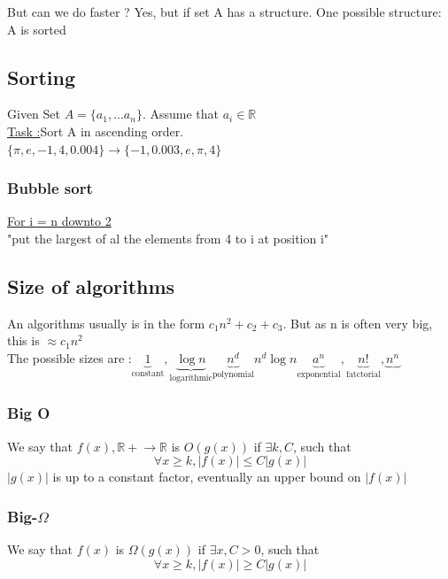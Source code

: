 \documentclass[12pt,a4paper]{article}
\begin{document}
But can we do faster ? Yes, but if set A has a structure. One possible structure: A is sorted

\subsection{Sorting}
Given Set $A = \{a_1,...a_n\}$. Assume that $a_i \in \mathbb{R}$\\
\underline{Task :}Sort A in ascending order.\\
$\{\pi, e, -1, 4, 0.004\} \rightarrow \{-1, 0.003, e, \pi, 4\}$

\subsubsection{Bubble sort}
\underline{For i = n downto 2}\\
"put the largest of al the elements from 4 to i at position i"

\subsection{Size of algorithms}
An algorithms usually is in the form $c_1n^2+c_2+c_3$. But as n is often very big, this is $\approx c_1n^2$\\
The possible sizes are :$\underbrace{1}_{\text{constant}}, \underbrace{\log n}_{\text{logarithmic}} \underbrace{n^d}_{\text{polynomial}} n^d \log n \underbrace{a^n}_{\text{exponential}}, \underbrace{n!}_{\text{fatctorial}}, \underbrace{n^n}$

\subsubsection{Big O}
We say that $f(x), \mathbb{R+} \to \mathbb{R}$ is $O(g(x))$ if $\exists k, C$, such that 
\begin{equation*}
\forall x \geq k  , |f(x)| \leq C|g(x)|
\end{equation*}
$|g(x)|$ is up to a constant factor, eventually an upper bound on $|f(x)|$

\subsubsection{Big-$\Omega$}
We say that $f(x)$ is $\Omega(g(x))$ if $\exists x, C > 0$, such that 
\begin{equation*}
\forall x \geq k, |f(x)| \geq C|g(x)|
\end{equation*}
\end{document}
